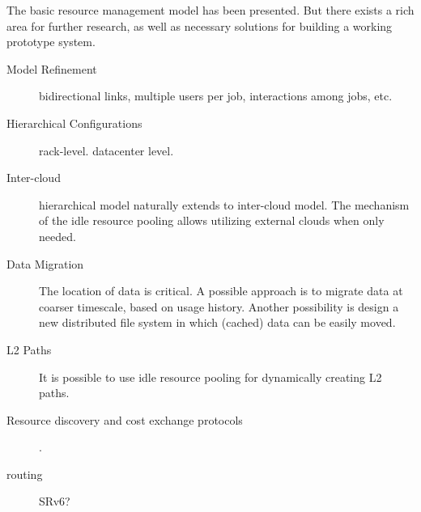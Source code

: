 
The basic resource management model has been presented.
But there exists a rich area for further research, as well as
necessary solutions for building a working prototype system.

\begin{description}

  \item[Model Refinement]  bidirectional links, multiple users per job,
        interactions among jobs, etc.

  \item[Hierarchical Configurations]
        rack-level.  datacenter level.

  \item[Inter-cloud]
        hierarchical model naturally extends to inter-cloud model.
        The mechanism of the idle resource pooling allows utilizing external
        clouds when only needed.

  \item[Data Migration]
        The location of data is critical.
        A possible approach is to migrate data at coarser timescale, based
        on usage history.
        Another possibility is design a new distributed file system in which
        (cached) data can be easily moved.

  \item[L2 Paths] It is possible to use idle resource pooling for dynamically
        creating L2 paths.

  \item[Resource discovery and cost exchange protocols]
        \cite{Albrecht2008}.

  \item[routing] SRv6?

\end{description}
